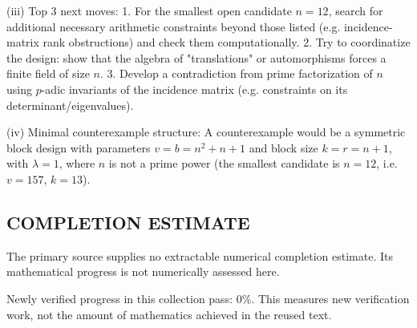 (iii) Top 3 next moves:
  1. For the smallest open candidate $n=12$, search for additional necessary arithmetic constraints beyond those listed (e.g. incidence-matrix rank obstructions) and check them computationally.
  2. Try to coordinatize the design: show that the algebra of "translations" or automorphisms forces a finite field of size $n$.
  3. Develop a contradiction from prime factorization of $n$ using $p$-adic invariants of the incidence matrix (e.g. constraints on its determinant/eigenvalues).

(iv) Minimal counterexample structure: A counterexample would be a symmetric block design with parameters $v=b=n^2+n+1$ and block size $k=r=n+1$, with $\lambda=1$, where $n$ is not a prime power (the smallest candidate is $n=12$, i.e. $v=157$, $k=13$).




\subsection*{COMPLETION ESTIMATE}
The primary source supplies no extractable numerical completion estimate. Its mathematical progress is not numerically assessed here.

Newly verified progress in this collection pass: $0\%$. This measures new verification work, not the amount of mathematics achieved in the reused text.
